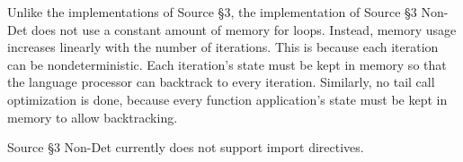 Unlike the implementations of Source \S 3,  the implementation of Source \S 3 Non-Det does not use a constant amount of memory for loops. Instead, memory usage increases linearly with the number of iterations. This is because each iteration can be nondeterministic. Each iteration's state must be kept in memory so that the language processor can backtrack to every iteration. Similarly, no tail call optimization is done, because every function application's state must be kept in memory to allow backtracking.

Source \S 3 Non-Det currently does not support import directives.



\newpage



\newpage







































\newpage



\newpage



\newpage



    
